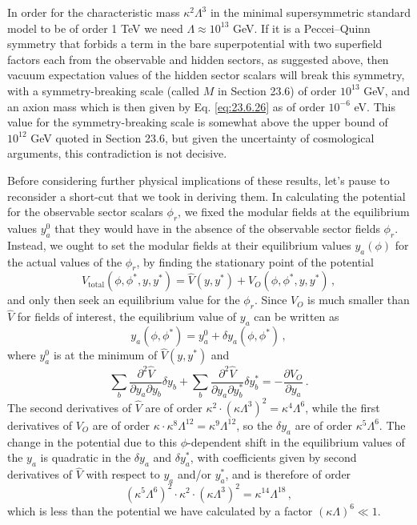 In order for the characteristic mass \(\kappa^2\Lambda^3\) in the minimal
supersymmetric standard model to be of order 1 TeV we need
\(\Lambda\approx10^{13}\) GeV. If it is a Peccei--Quinn symmetry that
forbids a term in the bare superpotential with two superfield factors each
from the observable and hidden sectors, as suggested above, then vacuum
expectation values of the hidden sector scalars will break this symmetry,
with a symmetry-breaking scale (called \(M\) in Section 23.6) of order
\(10^{13}\) GeV, and an axion mass which is then given by
Eq. \eqref{eq:23.6.26} as of order \(10^{-6}\) eV. This value for the
symmetry-breaking scale is somewhat above the upper bound of \(10^{12}\)
GeV quoted in Section 23.6, but given the uncertainty of cosmological
arguments, this contradiction is not decisive.

Before considering further physical implications of these results, let's
pause to reconsider a short-cut that we took in deriving them. In
calculating the potential for the observable sector scalars \(\phi_r\), we
fixed the modular fields at the equilibrium values \(y_a^0\) that they would
have in the absence of the observable sector fields \(\phi_r\). Instead, we
ought to set the modular fields at their equilibrium values \(y_a(\phi)\)
for the actual values of the \(\phi_r\), by finding the stationary point of
the potential
\begin{equation}
  V_{\mathrm{total}}(\phi,\phi^*,y,y^*)
  =\widehat V(y,y^*)+V_O(\phi,\phi^*,y,y^*)\,,
  \tag{31.7.49}\label{eq:31.7.49}
\end{equation}
and only then seek an equilibrium value for the \(\phi_r\). Since \(V_O\)
is much smaller than \(\widehat V\) for fields of interest, the equilibrium
value of \(y_a\) can be written as
\begin{equation}
  y_a(\phi,\phi^*)=y_a^0+\delta y_a(\phi,\phi^*)\,,
  \tag{31.7.50}\label{eq:31.7.50}
\end{equation}
where \(y_a^0\) is at the minimum of \(\widehat V(y,y^*)\) and
\begin{equation}
  \sum_b\frac{\partial^2\widehat V}{\partial y_a\partial y_b}
    \delta y_b
  +\sum_b\frac{\partial^2\widehat V}{\partial y_a\partial y_b^*}
    \delta y_b^*
  =-\frac{\partial V_O}{\partial y_a}\,.
  \tag{31.7.51}\label{eq:31.7.51}
\end{equation}
The second derivatives of \(\widehat V\) are of order
\(\kappa^2\cdot(\kappa\Lambda^3)^2=\kappa^4\Lambda^6\), while the first
derivatives of \(V_O\) are of order
\(\kappa\cdot\kappa^8\Lambda^{12}=\kappa^9\Lambda^{12}\), so the
\(\delta y_a\) are of order \(\kappa^5\Lambda^6\). The change in the
potential due to this \(\phi\)-dependent shift in the equilibrium values of
the \(y_a\) is quadratic in the \(\delta y_a\) and \(\delta y_a^*\), with
coefficients given by second derivatives of \(\widehat V\) with respect to
\(y_a\) and/or \(y_a^*\), and is therefore of order
\[
  (\kappa^5\Lambda^6)^2\cdot\kappa^2\cdot(\kappa\Lambda^3)^2
  =\kappa^{14}\Lambda^{18}\,,
\]
which is less than the potential we have calculated by a factor
\((\kappa\Lambda)^6\ll1\).

